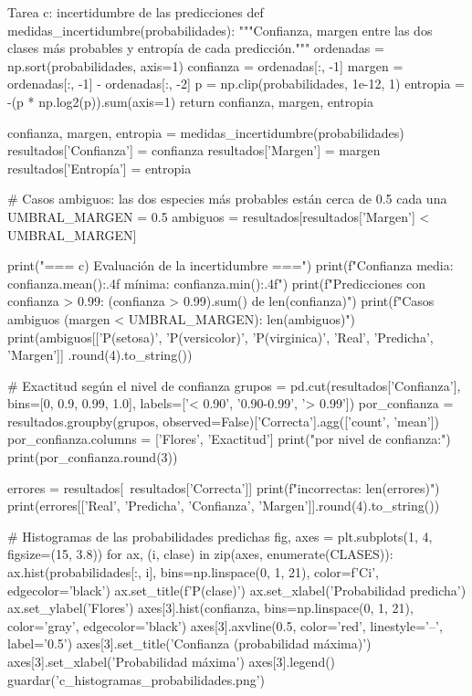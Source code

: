 \documentclass[11pt,letterpaper]{article}
\begin{document}
\begin{codigo}[label=cod:c]{Tarea c: incertidumbre de las predicciones}
def medidas_incertidumbre(probabilidades):
    """Confianza, margen entre las dos clases más probables y entropía de cada predicción."""
    ordenadas = np.sort(probabilidades, axis=1)
    confianza = ordenadas[:, -1]
    margen = ordenadas[:, -1] - ordenadas[:, -2]
    p = np.clip(probabilidades, 1e-12, 1)
    entropia = -(p * np.log2(p)).sum(axis=1)
    return confianza, margen, entropia


confianza, margen, entropia = medidas_incertidumbre(probabilidades)
resultados['Confianza'] = confianza
resultados['Margen'] = margen
resultados['Entropía'] = entropia

# Casos ambiguos: las dos especies más probables están cerca de 0.5 cada una
UMBRAL_MARGEN = 0.5
ambiguos = resultados[resultados['Margen'] < UMBRAL_MARGEN]

print("\n=== c) Evaluación de la incertidumbre ===")
print(f"Confianza media: {confianza.mean():.4f}   mínima: {confianza.min():.4f}")
print(f"Predicciones con confianza > 0.99: {(confianza > 0.99).sum()} de {len(confianza)}")
print(f"Casos ambiguos (margen < {UMBRAL_MARGEN}): {len(ambiguos)}")
print(ambiguos[['P(setosa)', 'P(versicolor)', 'P(virginica)', 'Real', 'Predicha', 'Margen']]
      .round(4).to_string())

# Exactitud según el nivel de confianza
grupos = pd.cut(resultados['Confianza'], bins=[0, 0.9, 0.99, 1.0],
                labels=['< 0.90', '0.90-0.99', '> 0.99'])
por_confianza = resultados.groupby(grupos, observed=False)['Correcta'].agg(['count', 'mean'])
por_confianza.columns = ['Flores', 'Exactitud']
print("\nExactitud por nivel de confianza:")
print(por_confianza.round(3))

errores = resultados[~resultados['Correcta']]
print(f"\nPredicciones incorrectas: {len(errores)}")
print(errores[['Real', 'Predicha', 'Confianza', 'Margen']].round(4).to_string())

# Histogramas de las probabilidades predichas
fig, axes = plt.subplots(1, 4, figsize=(15, 3.8))
for ax, (i, clase) in zip(axes, enumerate(CLASES)):
    ax.hist(probabilidades[:, i], bins=np.linspace(0, 1, 21), color=f'C{i}', edgecolor='black')
    ax.set_title(f'P({clase})')
    ax.set_xlabel('Probabilidad predicha')
    ax.set_ylabel('Flores')
axes[3].hist(confianza, bins=np.linspace(0, 1, 21), color='gray', edgecolor='black')
axes[3].axvline(0.5, color='red', linestyle='--', label='0.5')
axes[3].set_title('Confianza (probabilidad máxima)')
axes[3].set_xlabel('Probabilidad máxima')
axes[3].legend()
guardar('c_histogramas_probabilidades.png')


\end{codigo}
\end{document}
